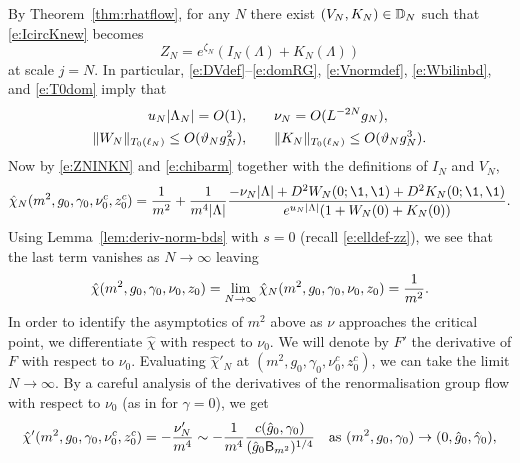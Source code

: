 By Theorem~\ref{thm:rhatflow}, for any $N$ there exist
$(V_N, K_N) \in \mathbb{D}_N$ such that \eqref{e:IcircKnew} becomes
\begin{equation}
\label{e:ZNINKN}
Z_N = e^{\zeta_N} (I_N(\Lambda) + K_N(\Lambda))
\end{equation}
at scale $j = N$. In particular, \eqref{e:DVdef}--\eqref{e:domRG},
\eqref{e:Vnormdef}, \eqref{e:Wbilinbd}, and \eqref{e:T0dom} imply that
\begin{align}
\label{e:unu-bd}
u_N |\Lambda_N| = O(1),
	&\qquad
\nu_N = O(L^{-2 N} g_N),
	\\
\label{e:WKbd}
\|W_N\|_{T_0(\ell_N)} \le O(\vartheta_N g_N^2),
	&\qquad
\|K_N\|_{T_0(\ell_N)} \le O(\vartheta_N g_N^3).
\end{align}
Now by \eqref{e:ZNINKN} and \eqref{e:chibarm} together with the definitions of $I_N$ and $V_N$,
\begin{equation}
\hat\chi_N(m^2, \gcc_0, \gamma_0, \nu_0^c, z_0^c)
	=
\frac{1}{m^2}
	+
\frac{1}{m^4 |\Lambda|}
\frac{-\nu_N |\Lambda| + D^2 W_N(0; \1, \1) + D^2 K_N(0; \1, \1)}{e^{u_N |\Lambda|} (1 + W_N(0) + K_N(0))}.
\end{equation}
Using Lemma~\ref{lem:deriv-norm-bds} with $s = 0$ (recall \eqref{e:elldef-zz}),
we see that the last term vanishes as $N\to\infty$ leaving
\begin{equation}
\label{e:chi-m-hat}
\hat\chi(m^2, g_0, \gamma_0, \nu_0, z_0)
	=
\lim_{N\rightarrow\infty} \hat\chi_N(m^2, g_0, \gamma_0, \nu_0, z_0)
	=
\frac{1}{m^2}.
\end{equation}
In order to identify the asymptotics of $m^2$ above as $\nu$ approaches the
critical point, we differentiate $\hat\chi$ with respect to $\nu_0$. We will
denote by $F'$ the derivative of $F$ with respect to $\nu_0$. Evaluating
$\hat\chi'_N$ at $(m^2, g_0, \gamma_0, \nu_0^c, z_0^c)$, we can take the
limit $N\to\infty$. By a careful analysis of the derivatives of the renormalisation
group flow with respect to $\nu_0$ (as in \cite[Section~\ref{log-sec:pfmr}]{BBS-saw4-log}
for $\gamma = 0$), we get
\begin{equation}
\label{e:chiprime-m-hat}
\hat\chi'(m^2, g_0, \gamma_0, \nu_0^c, z_0^c)
	=
-\frac{\nu_N'}{m^4}
	\sim
-\frac{1}{m^4} \frac{c(\hat{g}_0, \gamma_0)}{(\hat{g}_0{\sf B}_{m^2})^{1/4}}
	\quad
\text{as $(m^2,g_0,\gamma_0) \rightarrow (0,\hat{g}_0,\hat\gamma_0)$},
\end{equation}
